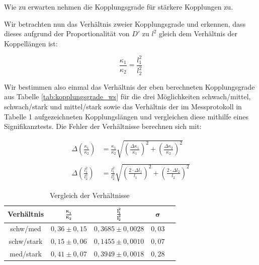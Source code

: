 \documentclass{article}
\begin{document}
\phantom{.}

Wie zu erwarten nehmen die Kopplungsgrade für stärkere Kopplungen zu.

Wir betrachten nun das Verhältnis zweier Kopplungsgrade und erkennen, dass dieses aufgrund der Proportionalität von $D'$ zu $l^2$ gleich dem Verhältnis der Koppellängen ist:

\begin{equation}
    \frac{\kappa_1}{\kappa_2} = \frac{l^2_1}{l^2_2}
\end{equation}

Wir bestimmen also einmal das Verhältnis der eben berechneten Kopplungsgrade aus Tabelle \ref{tab:kopplungsgrade_ws} für die drei Möglichkeiten schwach/mittel, schwach/stark und mittel/stark sowie das Verhältnis der im Messprotokoll in Tabelle 1 aufgezeichneten Kopplungslängen und vergleichen diese mithilfe eines Signifikanztests. Die Fehler der Verhältnisse berechnen sich mit:

\begin{equation}
    \begin{split}
        \Delta \left( \frac{\kappa_1}{\kappa_2} \right) &= \frac{\kappa_1}{\kappa_2} \sqrt{\left( \frac{\Delta \kappa_1}{\kappa_1} \right)^2 + \left( \frac{\Delta \kappa_2}{\kappa_2} \right)^2} \\ \\
        \Delta \left( \frac{l^2_1}{l^2_2} \right) &= \frac{l^2_1}{l^2_2} \sqrt{\left( \frac{2 \cdot \Delta l_1}{l_1} \right)^2 + \left( \frac{2 \cdot \Delta l_2}{l_2} \right)^2}
    \end{split}
\end{equation}

\phantom{.}

\begin{table}[!h]
    \centering
    \begin{tabular}{ccccc}
        \hline
        \textbf{Verhältnis} & $\bm{\frac{\kappa_1}{\kappa_2}}$ & $\bm{\frac{l^2_1}{l^2_2}}$ & $\bm{\sigma}$  \\ \hline
        schw/med    & $0,36 \pm 0,15$       & $0,3685 \pm 0,0028$ & $0,03$  \\
        schw/stark  & $0,15 \pm 0,06$       & $0,1455 \pm 0,0010$ & $0,07$  \\
        med/stark   & $0,41 \pm 0,07$       & $0,3949 \pm 0,0018$ & $0,28$  \\ \hline
    \end{tabular}%
    \caption{Vergleich der Verhältnisse}
    \label{tab:vgl_verhältnisse}
\end{table}
\end{document}
